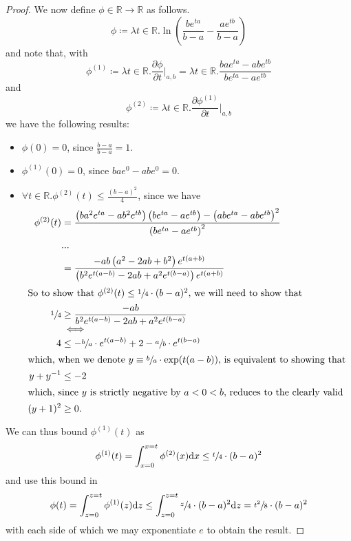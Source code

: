 \begin{proof}
		We now define $\phi \in \mathbb{R} \rightarrow \mathbb{R}$ as follows.
		$$
			\phi \coloneqq \lambda t \in \mathbb{R} . 
			\ln\left(\frac{be^{ta}}{b-a} - \frac{ae^{tb}}{b-a}\right)
		$$
		and note that, with 
		$$
			\phi^{(1)} \coloneqq\lambda t\in\mathbb{R}.
			\frac{\partial\phi}{\partial t}\bigg|_{a,b} =
			\lambda t \in \mathbb{R} . \frac{bae^{ta}-abe^{tb}}{be^{ta}-ae^{tb}}
		$$
		and
		$$
			\phi^{(2)}\coloneqq\lambda t\in\mathbb{R}.
			\frac{\partial\phi^{(1)}}{\partial t}\bigg|_{a,b} 
		$$
		we have the following results:
		\begin{itemize}
			\item $\phi(0) = 0$, since $\frac{b-a}{b-a} = 1$.
			\item $\phi^{(1)}(0) = 0$, since $bae^{0}-abe^{0} = 0$.
			\item $\forall t \in \mathbb{R}. \phi^{(2)}(t) \leq \frac{(b-a)^2}{4}$, 
			since we have 
			\begin{align*}
				\phi^{(2)}(t) &= 
				\frac{\left(ba^2e^{ta}-ab^2e^{tb}\right)
				\left(be^{ta}-ae^{tb}\right)- \left(abe^{ta}- abe^{tb}\right)^2}{
				\left(be^{ta}-ae^{tb}\right)^2} \\
				&...\\
				&= \frac{-ab\left(a^2-2ab+b^2\right)e^{t(a+b)}}{\left(
				b^2e^{t(a-b)}-2ab+a^2e^{t(b-a)}\right)e^{t(a+b)}} \\
			\intertext{So to show that $\phi^{(2)}(t) \leq \sfrac{1}{4}\cdot(b-a)^2$,
			we will need to show that}
				\sfrac{1}{4} &\geq 
				\frac{-ab}{b^2e^{t(a-b)}-2ab+a^2e^{t(b-a)}}  \\
				&\iff\\
				4 &\leq
				-\sfrac{b}{a}\cdot e^{t(a-b)} + 2 - \sfrac{a}{b}\cdot e^{t(b-a)}
				\\
			\intertext{which, when we denote $y \equiv \sfrac{b}{a}\cdot \exp(t(a-b))$,
			is equivalent to showing that}
			y + y^{-1} &\leq -2 \\
			\intertext{which, since $y$ is strictly negative by $a<0<b$, reduces to
			the clearly valid}
			(y+1)^2 &\geq 0.
			\end{align*}
		\end{itemize}
		\noindent
		We can thus bound $\phi^{(1)}(t)$ as 
		$$
			\phi^{(1)}(t) = \int_{x=0}^{x=t} \phi^{(2)}(x) \mathrm{d}x \leq 
			\sfrac{t}{4} \cdot (b-a)^2
		$$
		and use this bound in
		$$
			\phi(t) = \int_{z=0}^{z=t} \phi^{(1)}(z) \mathrm{d}z \leq
			\int_{z=0}^{z=t} \sfrac{z}{4} \cdot (b-a)^2 \mathrm{d}z =
			\sfrac{t^2}{8} \cdot (b-a)^2 
		$$
		with each side of which we may exponentiate $e$ to obtain the result.
	\end{proof}
	
